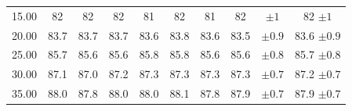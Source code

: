 \documentclass[11pt]{article}
\begin{document}
\begin{table}[h]
\begin{tabular}{cccccccccc}
15.00                                                 & 82                                             & 82                                             & 82                                             & 81                                             & 82                                             & 81                                             & 82                                             & $\pm 1$                                                          & 82 $\pm 1$                                                     \\
\rowcolor[HTML]{EFEFEF}
20.00                                                 & 83.7                                             & 83.7                                             & 83.7                                             & 83.6                                             & 83.8                                             & 83.6                                             & 83.5                                             & $\pm 0.9$                                                          & 83.6  $\pm 0.9$                                                    \\
25.00                                                 & 85.7                                             & 85.6                                             & 85.6                                             & 85.8                                             & 85.8                                             & 85.6                                             & 85.6                                             & $\pm 0.8$                                                          & 85.7 $\pm 0.8$                                                     \\
\rowcolor[HTML]{EFEFEF}
30.00                                                 & 87.1                                             & 87.0                                             & 87.2                                             & 87.3                                             & 87.3                                             & 87.3                                             & 87.3                                             & $\pm 0.7$                                                          & 87.2 $\pm 0.7$                                                     \\
35.00                                                 & \multicolumn{1}{r}{88.0}                         & \multicolumn{1}{r}{87.8}                         & \multicolumn{1}{r}{88.0}                         & \multicolumn{1}{r}{88.0}                         & \multicolumn{1}{r}{88.1}                         & \multicolumn{1}{r}{87.8}                         & \multicolumn{1}{r}{87.9}                         & $\pm 0.7$                                                          & 87.9 $\pm 0.7$                                                     \\

\end{tabular}
\end{table}
\end{document}
